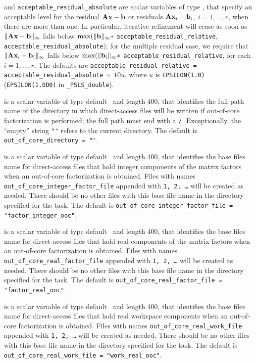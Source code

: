 \documentclass{galahad}
\newcommand{\packagename}{PSLS}
\newcommand{\fullpackagename}{\libraryname\_\-\packagename}
\begin{document}
\begin{description}
  and {\tt acceptable\_residual\_absolute}
are scalar variables of type \realdp, that
specify an acceptable level for the residual ${\mathbf{A}} {\mathbf{x}} - {\mathbf{b}}$ or residuals
${\mathbf{A}} {\mathbf{x}}_i - {\mathbf{b}}_i$, $i=1,\ldots,r$,  when there are more than one.
In particular, iterative refinement will cease as soon as
$\|{\mathbf{A}} {\mathbf{x}} - {\mathbf{b}}\|_{\infty}$ falls below
$\max (\| {\mathbf{b}}\|_{\infty} \ast$ {\tt acceptable\_residual\_relative},
{\tt acceptable\_residual\_absolute}$)$;
for the multiple residual case, we require that
$\|{\mathbf{A}} {\mathbf{x}}_i - {\mathbf{b}}_i\|_{\infty}$ falls below
$\max (\| {\mathbf{b}}_i\|_{\infty} \ast$ {\tt acceptable\_residual\_relative},
for each $i=1,\ldots,r$.
The defaults are {\tt acceptable\_residual\_relative =
acceptable\_resi\-dual\_absolute = }$10 u$,
where $u$ is {\tt EPSILON(1.0)} ({\tt EPSILON(1.0D0)} in
{\tt \fullpackagename\_double}).

is a scalar variable of type default \character\
and length 400, that identifies the full path name of the
directory in which direct-access files will be written if out-of-core
factorization is performed; the full path must end with a {\tt /}.
Exceptionally, the ``empty'' string {\tt ""} refers to the current
directory. The default is {\tt out\_of\_core\_directory = ""}.

is a scalar variable of type default \character\
and length 400, that identifies the base files name for direct-access files that
hold integer components of the matrix factors when an
out-of-core factorization is obtained.
Files with names
{\tt out\_of\_core\_integer\_factor\_file}
appended with {\tt 1, 2, \ldots} will be created as needed.
There should be no other files with this base file name in the directory
specified for the task.
The default is
{\tt out\_of\_core\_integer\_factor\_file = "factor\_integer\_ooc"}.

\itt{out\_of\_core\_real\_factor\_file}
is a scalar variable of type default \character\
and length 400, that identifies the base files name for direct-access files that
hold real components of the matrix factors when an
out-of-core factorization is obtained.
Files with names
{\tt out\_of\_core\_real\_factor\_file}
appended with {\tt 1, 2, \ldots} will be created as needed.
There should be no other files with this base file name in the directory
specified for the task.
The default is
{\tt out\_of\_core\_real\_factor\_file =
"factor\_real\_ooc"}.

is a scalar variable of type default \character\
and length 400, that identifies the base files name for direct-access files that
hold real workspace components when an
out-of-core factorization is obtained.
Files with names
{\tt out\_of\_core\_real\_work\_file}
appended with {\tt 1, 2, \ldots} will be created as needed.
There should be no other files with this base file name in the directory
specified for the task.
The default is
{\tt out\_of\_core\_real\_work\_file = "work\_real\_ooc"}.


\end{description}
\end{document}
